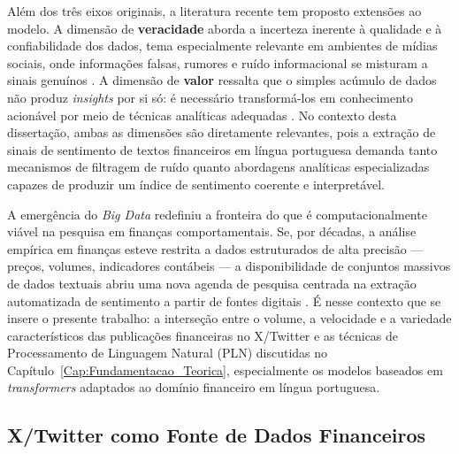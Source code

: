Além dos três eixos originais, a literatura recente tem proposto extensões ao modelo. A dimensão de \textbf{veracidade} aborda a incerteza inerente à qualidade e à confiabilidade dos dados, tema especialmente relevante em ambientes de mídias sociais, onde informações falsas, rumores e ruído informacional se misturam a sinais genuínos \cite{chen2014bigdata}. A dimensão de \textbf{valor} ressalta que o simples acúmulo de dados não produz \textit{insights} por si só: é necessário transformá-los em conhecimento acionável por meio de técnicas analíticas adequadas \cite{chen2014bigdata}. No contexto desta dissertação, ambas as dimensões são diretamente relevantes, pois a extração de sinais de sentimento de textos financeiros em língua portuguesa demanda tanto mecanismos de filtragem de ruído quanto abordagens analíticas especializadas capazes de produzir um índice de sentimento coerente e interpretável.

A emergência do \textit{Big Data} redefiniu a fronteira do que é computacionalmente viável na pesquisa em finanças comportamentais. Se, por décadas, a análise empírica em finanças esteve restrita a dados estruturados de alta precisão --- preços, volumes, indicadores contábeis --- a disponibilidade de conjuntos massivos de dados textuais abriu uma nova agenda de pesquisa centrada na extração automatizada de sentimento a partir de fontes digitais \cite{kearney2014,antweiler2004}. É nesse contexto que se insere o presente trabalho: a interseção entre o volume, a velocidade e a variedade característicos das publicações financeiras no X/Twitter e as técnicas de Processamento de Linguagem Natural (PLN) discutidas no Capítulo~\ref{Cap:Fundamentacao_Teorica}, especialmente os modelos baseados em \textit{transformers} adaptados ao domínio financeiro em língua portuguesa.


\subsection{X/Twitter como Fonte de Dados Financeiros}
\label{subsec:twitter_dados_financeiros}

